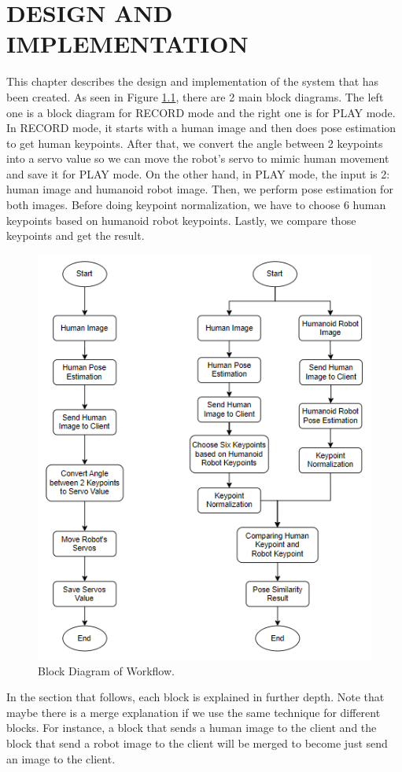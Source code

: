 \chapter{DESIGN AND IMPLEMENTATION}
\label{chap:design-and-implementation}


This chapter describes the design and implementation of the system that has been created.
As seen in Figure \ref{fig:block-diagram}, there are 2 main block diagrams. The left one is a block diagram for RECORD mode and the right one is for PLAY mode.
In RECORD mode, it starts with a human image and then does pose estimation to get human keypoints. After that, we convert the angle between 2 keypoints into a servo value so we can move the robot's servo to mimic human movement and save it for PLAY mode.
On the other hand, in PLAY mode, the input is 2: human image and humanoid robot image. Then, we perform pose estimation for both images. Before doing keypoint normalization, we have to choose 6 human keypoints based on humanoid robot keypoints. Lastly, we compare those keypoints and get the result.
\begin{figure}[ht]
  \centering
  \includegraphics[scale=1.23]{gambar/diagram-block-revisi.png}
  \caption{Block Diagram of Workflow.}
  \label{fig:block-diagram}
\end{figure}
In the section that follows, each block is explained in further depth. Note that maybe there is a merge explanation if we use the same technique for different blocks. For instance, a block that sends a human image to the client and the block that send a robot image to the client will be merged to become just send an image to the client.


